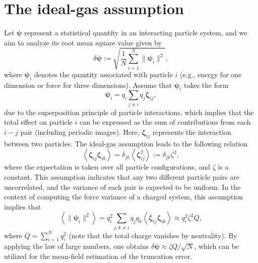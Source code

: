 \section{The ideal-gas assumption}\label{app::ideal-gas}
Let $\bm{\psi}$ represent a statistical quantity in an interacting particle system, and we aim to analyze its root mean square value given by
\begin{equation}\label{eq::deltaS}
    \delta \bm{\psi}:=\sqrt{\frac{1}{N}\sum_{i=1}^{N}\|\bm{\psi}_{i}\|^2},
\end{equation}
where $\bm{\psi}_{i}$ denotes the quantity associated with particle $i$ (e.g., energy for one dimension or force for three dimensions). Assume that $\bm{\psi}_{i}$ takes the form
\begin{equation}
	\bm{\psi}_{i}=q_{i} \sum_{j \neq i} q_{j} \bm{\zeta}_{i j},
\end{equation}
due to the superposition principle of particle interactions, which implies that the total effect on particle $i$ can be expressed as the sum of contributions from each $i-j$ pair (including periodic images). Here, $\bm{\zeta}_{i j}$ represents the interaction between two particles. The ideal-gas assumption leads to the following relation
\begin{equation}
	\left\langle\boldsymbol{\zeta}_{i j} \boldsymbol{\zeta}_{i k}\right\rangle=\delta_{j k}\left\langle\boldsymbol{\zeta}_{i j}^2\right\rangle:=\delta_{j k} \zeta^2,
\end{equation}
where the expectation is taken over all particle configurations, and $\zeta$ is a constant. This assumption indicates that any two different particle pairs are uncorrelated, and the variance of each pair is expected to be uniform. In the context of computing the force variance of a charged system, this assumption implies that
\begin{equation}
	\left\langle\|\bm{\psi}_{i}\|^2\right\rangle=q_{i}^2 \sum_{j, k \neq i} q_{j} q_k\left\langle\boldsymbol{\zeta}_{i j} \boldsymbol{\zeta}_{i k}\right\rangle \approx q_{i}^2 \zeta^2 Q,
\end{equation}
where $Q=\sum_{i=1}^{N}q_i^2$ (note that the total charge vanishes by neutrality). By applying the law of large numbers, one obtains $\delta\bm{\psi}\approx \zeta Q/\sqrt{N}$, which can be utilized for the mean-field estimation of the truncation error.

